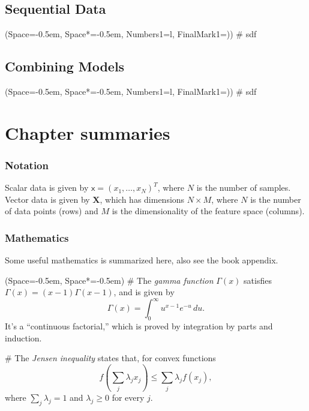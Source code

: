 \documentclass[12pt, a4paper]{article}
\newcommand{\listSpace}{-0.5em}%
\newcommand{\vect}[1]{\bm{#1}}
\begin{document}
\subsection{Sequential Data}
\begin{easylist}[itemize]
	\ListProperties(Space=\listSpace, Space*=\listSpace, Numbers1=l, FinalMark1={)})
	# sdf
\end{easylist}

\subsection{Combining Models}
\begin{easylist}[itemize]
	\ListProperties(Space=\listSpace, Space*=\listSpace, Numbers1=l, FinalMark1={)})
	# sdf
\end{easylist}






\clearpage

\section{Chapter summaries}

\subsubsection*{Notation}
Scalar data is given by $\mathsf{x} = \left(x_1, \dots, x_N\right)^T$, where $N$ is the number of samples. 
Vector data is given by $\vect{X}$, which has dimensions $N \times M$, where $N$ is the number of data points (rows) and $M$ is the dimensionality of the feature space (columns).

\subsubsection*{Mathematics}
Some useful mathematics is summarized here, also see the book appendix.
\begin{easylist}[itemize]
	\ListProperties(Space=\listSpace, Space*=\listSpace)
	# The \emph{gamma function} $\Gamma(x)$ satisfies $\Gamma(x) = (x-1) \Gamma(x-1)$, and is given by
	\begin{equation*}
	\Gamma(x) = \int_{0}^{\infty} u^{x-1} e^{-u}  \, du.
	\end{equation*}
	It's a ``continuous factorial,'' which is proved by integration by parts and induction.
	
	# The \emph{Jensen inequality} states that, for convex functions
	\begin{equation*}
	f\left( \sum_j \lambda_j x_j\right) \leq \sum_j \lambda_j f(x_j),
	\end{equation*}
	where $\sum_j \lambda_j = 1$ and $\lambda_j \geq 0$ for every $j$.
\end{easylist}
\end{document}
